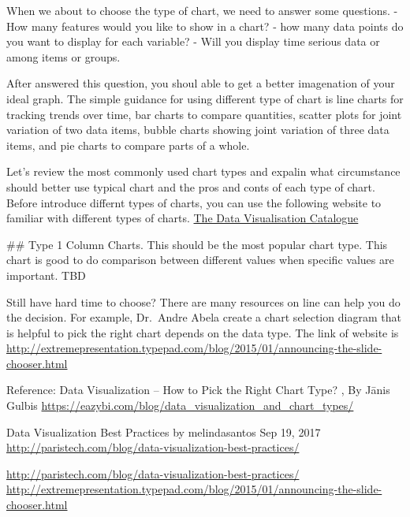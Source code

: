 \documentclass[]{book}
\theoremstyle{definition}
\theoremstyle{definition}
\theoremstyle{definition}
\theoremstyle{remark}
\begin{document}
When we about to choose the type of chart, we need to answer some
questions. - How many features would you like to show in a chart? - how
many data points do you want to display for each variable? - Will you
display time serious data or among items or groups.

After answered this question, you shoul able to get a better imagenation
of your ideal graph. The simple guidance for using different type of
chart is line charts for tracking trends over time, bar charts to
compare quantities, scatter plots for joint variation of two data items,
bubble charts showing joint variation of three data items, and pie
charts to compare parts of a whole.

Let's review the most commonly used chart types and expalin what
circumstance should better use typical chart and the pros and conts of
each type of chart. Before introduce differnt types of charts, you can
use the following website to familiar with different types of charts.
\href{https://datavizcatalogue.com/}{The Data Visualisation Catalogue}

\#\# Type 1 Column Charts. This should be the most popular chart type.
This chart is good to do comparison between different values when
specific values are important. TBD

Still have hard time to choose? There are many resources on line can
help you do the decision. For example, Dr.~Andre Abela create a chart
selection diagram that is helpful to pick the right chart depends on the
data type. The link of website is
\url{http://extremepresentation.typepad.com/blog/2015/01/announcing-the-slide-chooser.html}

Reference: Data Visualization -- How to Pick the Right Chart Type? , By
Jānis Gulbis
\url{https://eazybi.com/blog/data_visualization_and_chart_types/}

Data Visualization Best Practices by melindasantos \textbar{} Sep 19,
2017 \url{http://paristech.com/blog/data-visualization-best-practices/}

\url{http://paristech.com/blog/data-visualization-best-practices/}
\url{http://extremepresentation.typepad.com/blog/2015/01/announcing-the-slide-chooser.html}
\end{document}
